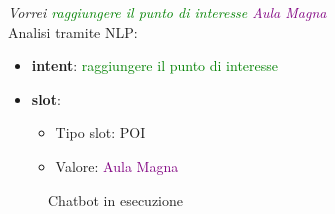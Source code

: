 \textit{Vorrei \textcolor{green}{raggiungere il punto di interesse} \textcolor{purple}{Aula Magna}}\\
Analisi tramite NLP:
\begin{itemize}
\item \textbf{intent}: \textcolor{green}{raggiungere il punto di interesse}
\item \textbf{slot}: 
\begin{itemize}
    \item Tipo slot: POI
    \item Valore: \textcolor{purple}{Aula Magna}
\end{itemize}
\end{itemize}
    

\begin{figure}[htp]
    \centering  
    \caption{Chatbot in esecuzione}

\end{figure}
